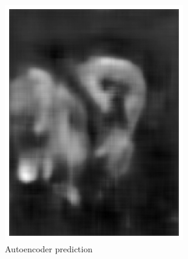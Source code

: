 \documentclass{l4proj}
\begin{document}
\begin{figure}[ht]
\begin{subfigure}[h!]{0.22\textwidth}
    \includegraphics[width=\textwidth, trim={0cm, 1cm, 0cm, 1cm}, clip]{images/autoencoder/pony_2/auto.png}
    \caption{Autoencoder prediction}
  \end{subfigure}
  \begin{subfigure}[h!]{0.22\textwidth}

\end{subfigure}
\end{figure}
\end{document}
